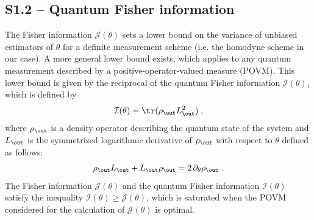 \documentclass[aps,pra,twocolumn,amsmath,amssymb,superscriptaddress,10pt,nobibnotes]{revtex4-2}
\begin{document}
\subsection*{S1.2 -- Quantum Fisher information}

The Fisher information $\mathcal{J}(\theta)$ sets a lower bound on the variance of unbiased estimators of $\theta$ for a definite measurement scheme (i.e. the homodyne scheme in our case). A more general lower bound exists, which applies to any quantum measurement described by a positive-operator-valued measure (POVM). This lower bound is given by the reciprocal of the quantum Fisher information $\mathcal{I}(\theta)$, which is defined by~\cite{helstrom_quantum_1969_1}
\begin{equation}
\mathcal{I}(\theta)=\tr (\rho_\out L_\out^2) \; ,
\label{quantum_fisher}
\end{equation}
where $\rho_\out$ is a density operator describing the quantum state of the system and $L_\out$ is the symmetrized logarithmic derivative of $\rho_\out$ with respect to $\theta$ defined as follows:
\begin{equation}
\rho_\out L_\out + L_\out \rho_\out = 2 \, \partial_\theta \rho_\out \; .
\end{equation}
The Fisher information $\mathcal{J}(\theta)$ and the quantum Fisher information $\mathcal{I}(\theta)$ satisfy the inequality $\mathcal{I}(\theta)\geq \mathcal{J}(\theta)$, which is saturated when the POVM considered for the calculation of $\mathcal{J}(\theta)$ is optimal.
\end{document}
